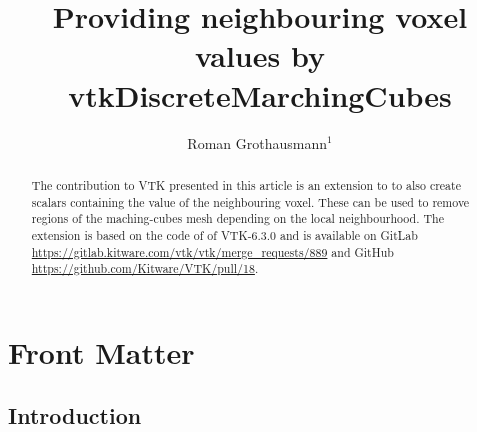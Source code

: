 \documentclass{InsightArticle}
\title{Providing neighbouring voxel values by vtkDiscreteMarchingCubes}
\author{Roman Grothausmann$^{1}$}
\newcommand{\IJhandlerIDnumber}{xxxx}
\begin{document}
%
%
\IJhandlefooter{\IJhandlerIDnumber}


\ifpdf
\else
\fi


\maketitle


\ifhtml
\chapter*{Front Matter\label{front}}
\fi


\begin{abstract}
\noindent
The contribution to VTK presented in this article is an extension to  to also create  scalars containing the value of the neighbouring voxel. These can be used to remove regions of the maching-cubes\citep{Lorensen1987} mesh depending on the local neighbourhood.
The extension is based on the code of  of VTK-6.3.0 and is available on GitLab \url{https://gitlab.kitware.com/vtk/vtk/merge_requests/889} and GitHub \url{https://github.com/Kitware/VTK/pull/18}.
\end{abstract}

\IJhandlenote{\IJhandlerIDnumber}

\tableofcontents

\pagebreak

\section{Introduction}
\end{document}
